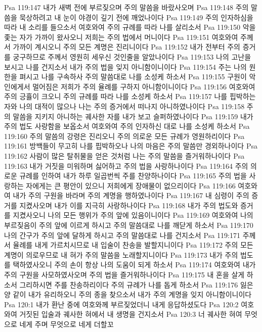 Psa 119:147  내가 새벽 전에 부르짖으며 주의 말씀을 바랐사오며
Psa 119:148  주의 말씀을 묵상하려고 내 눈이 야경이 깊기 전에 깨었나이다
Psa 119:149  주의 인자하심을 따라 내 소리를 들으소서 여호와여 주의 규례를 따라 나를 살리소서
Psa 119:150  악을 좇는 자가 가까이 왔사오니 저희는 주의 법에서 머니이다
Psa 119:151  여호와여 주께서 가까이 계시오니 주의 모든 계명은 진리니이다
Psa 119:152  내가 전부터 주의 증거를 궁구하므로 주께서 영원히 세우신 것인줄을 알았나이다
Psa 119:153  나의 고난을 보시고 나를 건지소서 내가 주의 법을 잊지 아니함이니이다
Psa 119:154  주는 나의 원한을 펴시고 나를 구속하사 주의 말씀대로 나를 소성케 하소서
Psa 119:155  구원이 악인에게서 멀어짐은 저희가 주의 율례를 구하지 아니함이니이다
Psa 119:156  여호와여 주의 긍휼이 크오니 주의 규례를 따라 나를 소성케 하소서
Psa 119:157  나를 핍박하는 자와 나의 대적이 많으나 나는 주의 증거에서 떠나지 아니하였나이다
Psa 119:158  주의 말씀을 지키지 아니하는 궤사한 자를 내가 보고 슬퍼하였나이다
Psa 119:159  내가 주의 법도 사랑함을 보옵소서 여호와여 주의 인자하신 대로 나를 소성케 하소서
Psa 119:160  주의 말씀의 강령은 진리오니 주의 의로운 모든 규례가 영원하리이다
Psa 119:161  방백들이 무고히 나를 핍박하오나 나의 마음은 주의 말씀만 경외하나이다
Psa 119:162  사람이 많은 탈취물을 얻은 것처럼 나는 주의 말씀을 즐거워하나이다
Psa 119:163  내가 거짓을 미워하며 싫어하고 주의 법을 사랑하나이다
Psa 119:164  주의 의로운 규례를 인하여 내가 하루 일곱번씩 주를 찬양하나이다
Psa 119:165  주의 법을 사랑하는 자에게는 큰 평안이 있으니 저희에게 장애물이 없으리이다
Psa 119:166  여호와여 내가 주의 구원을 바라며 주의 계명을 행하였나이다
Psa 119:167  내 심령이 주의 증거를 지켰사오며 내가 이를 지극히 사랑하나이다
Psa 119:168  내가 주의 법도와 증거를 지켰사오니 나의 모든 행위가 주의 앞에 있음이니이다
Psa 119:169  여호와여 나의 부르짖음이 주의 앞에 이르게 하시고 주의 말씀대로 나를 깨닫게 하소서
Psa 119:170  나의 간구가 주의 앞에 달하게 하시고 주의 말씀대로 나를 건지소서
Psa 119:171  주께서 율례를 내게 가르치시므로 내 입술이 찬송을 발할지니이다
Psa 119:172  주의 모든 계명이 의로우므로 내 혀가 주의 말씀을 노래할지니이다
Psa 119:173  내가 주의 법도를 택하였사오니 주의 손이 항상 나의 도움이 되게 하소서
Psa 119:174  여호와여 내가 주의 구원을 사모하였사오며 주의 법을 즐거워하나이다
Psa 119:175  내 혼을 살게 하소서 그리하시면 주를 찬송하리이다 주의 규례가 나를 돕게 하소서
Psa 119:176  잃은 양 같이 내가 유리하오니 주의 종을 찾으소서 내가 주의 계명을 잊지 아니함이니이다
Psa 120:1  내가 환난 중에 여호와께 부르짖었더니 내게 응답하셨도다
Psa 120:2  여호와여 거짓된 입술과 궤사한 혀에서 내 생명을 건지소서
Psa 120:3  너 궤사한 혀여 무엇으로 네게 주며 무엇으로 네게 더할꼬
